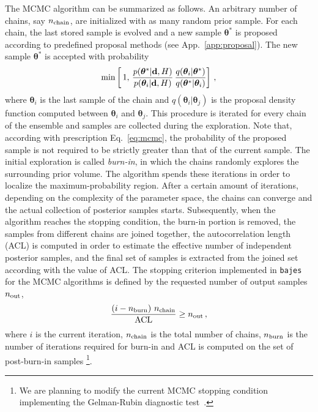 \documentclass[prd,aps,twocolumn,a4paper,showkeys,nofootinbib,floatfix]{revtex4-1}
\newcommand{\be}{\begin{equation}}
\newcommand{\ee}{\end{equation}}
\def\params{\boldsymbol{\theta}}
\def\data{\textbf{d}}
\newcommand{\bajes}{{\tt bajes}}
\begin{document}
The MCMC algorithm can be summarized as follows.
An arbitrary number of chains, say $n_{\rm chain}$,
 are initialized with as many random prior sample.
For each chain, the last stored sample is evolved and 
a new sample $\params^*$ is proposed according to 
predefined proposal methods (see App.~\ref{app:proposal}).
The new sample $\params^*$
is accepted with probability 
\be
\label{eq:mcmc}
{\rm min}\left[\,1,\,\frac{p(\params^*|\data,H)}{p(\params_i|\data,H)}\,\frac{q(\params_i|\params^*)}{q(\params^*|\params_i)}\right]\,,
\ee
where $\params_i$ is the last sample of the chain
and $q(\params_i|\params_j)$ is the proposal density function 
computed between $\params_i$ and 
$\params_j$. 
This procedure is iterated for every chain of the ensemble
and samples are collected during the exploration.
Note that, according with prescription Eq.~\eqref{eq:mcmc},
the probability of the proposed sample is not required to
 be strictly greater than that of the current sample.
The initial exploration is called {\it burn-in}, in which
the chains randomly explores the surrounding prior volume.
The algorithm spends these iterations in order to localize the maximum-probability region.
After a certain amount of iterations, depending on the complexity of the parameter space, 
the chains can converge and the actual collection 
of posterior samples starts.
Subsequently,
when the algorithm reaches the stopping condition,
the burn-in portion is removed, 
the samples from different chains are joined together, 
the autocorrelation length (ACL) is computed in order to estimate the effective 
number of independent posterior samples,
and the final set of samples is extracted from the joined set according with the value of ACL.
The stopping criterion implemented in {\bajes} for the MCMC algorithms 
is defined by the requested number of output samples $n_{\rm out}$,
\be
\label{eq:mcmcstop}
\frac{\left( i- n_{\rm burn}\right)\, n_{\rm chain}}{{\rm ACL}} \ge n_{\rm out}\,,
\ee 
where $i$ is the current iteration, 
$n_{\rm chain}$ is the total number of chains, 
$n_{\rm burn}$ is the number of iterations required for burn-in
and ACL is computed on the set of post-burn-in samples
\footnote{We are planning to modify the current MCMC stopping 
condition implementing the Gelman-Rubin diagnostic test~\cite{gelman1992,Brooks:1998}.}.
\end{document}
